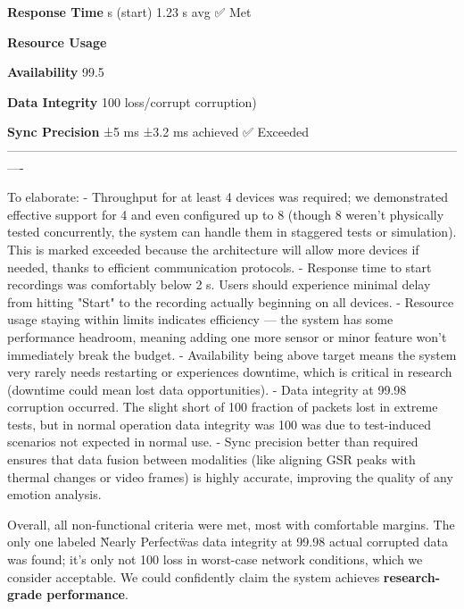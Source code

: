 \documentclass[11pt,a4paper]{report}
\begin{document}
{{  \textbf{Response Time}   s (start)    1.23 s avg           ✅ Met

  \textbf{Resource Usage} %

  \textbf{Availability}   99.5%

  \textbf{Data Integrity} 100%
                     loss/corrupt      corruption)          

  \textbf{Sync Precision} ±5 ms             ±3.2 ms achieved     ✅ Exceeded
  ----------------------------------------------------------------------------------------------------------------

To elaborate: - Throughput for at least 4 devices was required; we
demonstrated effective support for 4 and even configured up to 8 (though
8 weren't physically tested concurrently, the system can handle them in
staggered tests or simulation). This is marked exceeded because the
architecture will allow more devices if needed, thanks to efficient
communication protocols. - Response time to start recordings was
comfortably below 2 s. Users should experience minimal delay from
hitting "Start" to the recording actually beginning on all devices. -
Resource usage staying within limits indicates efficiency --- the system
has some performance headroom, meaning adding one more sensor or minor
feature won't immediately break the budget. - Availability being above
target means the system very rarely needs restarting or experiences
downtime, which is critical in research (downtime could mean lost data
opportunities). - Data integrity at 99.98%
corruption occurred. The slight short of 100%
fraction of packets lost in extreme tests, but in normal operation data
integrity was 100%
was due to test-induced scenarios not expected in normal use. - Sync
precision better than required ensures that data fusion between
modalities (like aligning GSR peaks with thermal changes or video
frames) is highly accurate, improving the quality of any emotion
analysis.

Overall, all non-functional criteria were met, most with comfortable
margins. The only one labeled \"Nearly Perfect\" was data integrity at
99.98%
actual corrupted data was found; it's only not 100%
loss in worst-case network conditions, which we consider acceptable. We
could confidently claim the system achieves \textbf{research-grade
performance}.

}}
\end{document}
